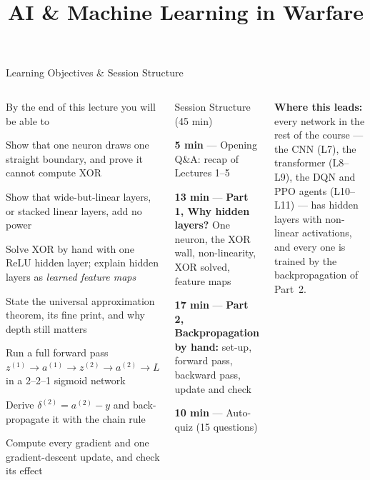 \documentclass[aspectratio=169,10pt]{beamer}
\title{AI \& Machine Learning in Warfare}
\begin{document}


\begin{frame}{Learning Objectives \& Session Structure}
\begin{columns}[T]
\begin{cbox}{By the end of this lecture you will be able to}
\begin{te}
\item Show that one neuron draws one straight boundary, and prove it cannot compute XOR
\item Show that wide-but-linear layers, or stacked linear layers, add no power
\item Solve XOR by hand with one ReLU hidden layer; explain hidden layers as \emph{learned feature maps}
\item State the universal approximation theorem, its fine print, and why depth still matters
\item Run a full forward pass $z^{(1)}\!\to a^{(1)}\!\to z^{(2)}\!\to a^{(2)}\!\to L$ in a 2--2--1 sigmoid network
\item Derive $\delta^{(2)}=a^{(2)}-y$ and back-propagate it with the chain rule
\item Compute every gradient and one gradient-descent update, and check its effect
\end{te}
\end{cbox}
\begin{cbox}[ISSAnavy]{Session Structure (45 min)}
\begin{tl}
\item \textbf{5 min} --- Opening Q\&A: recap of Lectures 1--5
\item \textbf{13 min} --- \textbf{Part 1, Why hidden layers?} One neuron, the XOR wall, non-linearity, XOR solved, feature maps
\item \textbf{17 min} --- \textbf{Part 2, Backpropagation by hand:} set-up, forward pass, backward pass, update and check
\item \textbf{10 min} --- Auto-quiz (15 questions)
\end{tl}
\end{cbox}
\begin{ibox}\scriptsize\textbf{Where this leads:} every network in the rest of the course --- the CNN (L7), the transformer (L8--L9), the DQN and PPO agents (L10--L11) --- has hidden layers with non-linear activations, and every one is trained by the backpropagation of Part~2.\end{ibox}
\end{columns}
\end{frame}
\end{document}

